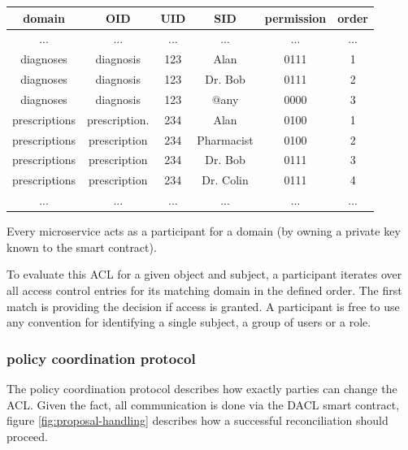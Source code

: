 \documentclass[12pt, conference]{IEEEtran}
\begin{document}
\begin{table}[!h]
\centering
\tiny
\begin{tabular}{|c|c|c|c|c|c|}
\hline \rule[-2ex]{0pt}{5.5ex} domain & OID & UID & SID & permission & order \\ 
\hline
... & ... & ... & ... & ... & ... \\
diagnoses & diagnosis & 123 & Alan & 0111 & 1 \\ 
diagnoses & diagnosis & 123 & Dr. Bob & 0111 & 2 \\ 
diagnoses & diagnosis & 123 & @any & 0000 & 3 \\ 
prescriptions & prescription. & 234 & Alan & 0100 & 1 \\ 
prescriptions & prescription & 234 & Pharmacist & 0100 & 2 \\
prescriptions & prescription & 234 & Dr. Bob & 0111 & 3 \\
prescriptions & prescription & 234 & Dr. Colin & 0111 & 4 \\
... & ... & ... & ... & ... & ... \\
\hline
\end{tabular}

\end{table}


Every microservice acts as a participant for a domain (by owning a private key known to the smart contract). 

To evaluate this ACL for a given object and subject, a participant iterates over all access control entries for its matching domain in the defined order. The first match is providing the decision if access is granted. A participant is free to use any convention for identifying a single subject, a group of users or a role. 


\subsubsection{policy coordination protocol}

The policy coordination protocol describes how exactly parties can change the ACL. Given the fact, all communication is done via the DACL smart contract, figure \ref{fig:proposal-handling} describes how a successful reconciliation should proceed. 
\end{document}
